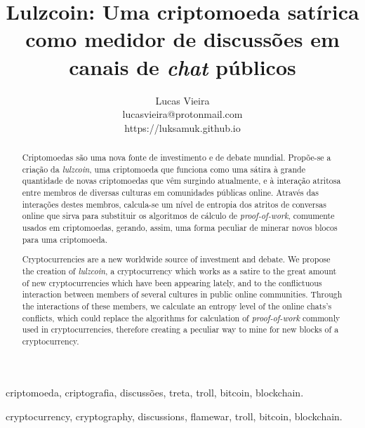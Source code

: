 \documentclass[conference]{IEEEtran}
\begin{document}

\title{Lulzcoin: Uma criptomoeda satírica como medidor de discussões em canais de \textit{chat} públicos}
\author{Lucas Vieira\\lucasvieira@protonmail.com\\https://luksamuk.github.io}


\maketitle


\begin{abstract}
Criptomoedas são uma nova fonte de investimento e de debate mundial. Propõe-se a criação da \textit{lulzcoin}, uma criptomoeda que funciona como uma sátira à grande quantidade de novas criptomoedas que vêm surgindo atualmente, e à interação atritosa entre membros de diversas culturas em comunidades públicas online. Através das interações destes membros, calcula-se um nível de entropia dos atritos de conversas online que sirva para substituir os algoritmos de cálculo de \textit{proof-of-work}, comumente usados em criptomoedas, gerando, assim, uma forma peculiar de minerar novos blocos para uma criptomoeda.
\end{abstract}
\begin{IEEEkeywords}
criptomoeda, criptografia, discussões, treta, troll, bitcoin, blockchain.
\end{IEEEkeywords}

\begin{abstract}
Cryptocurrencies are a new worldwide source of investment and debate. We propose the creation of \textit{lulzcoin}, a cryptocurrency which works as a satire to the great amount of new cryptocurrencies which have been appearing lately, and to the conflictuous interaction between members of several cultures in public online communities. Through the interactions of these members, we calculate an entropy level of the online chats's conflicts, which could replace the algorithms for calculation of \textit{proof-of-work} commonly used in cryptocurrencies, therefore creating a peculiar way to mine for new blocks of a cryptocurrency.
\end{abstract}
\begin{IEEEkeywords}
cryptocurrency, cryptography, discussions, flamewar, troll, bitcoin, blockchain.
\end{IEEEkeywords}
\end{document}

